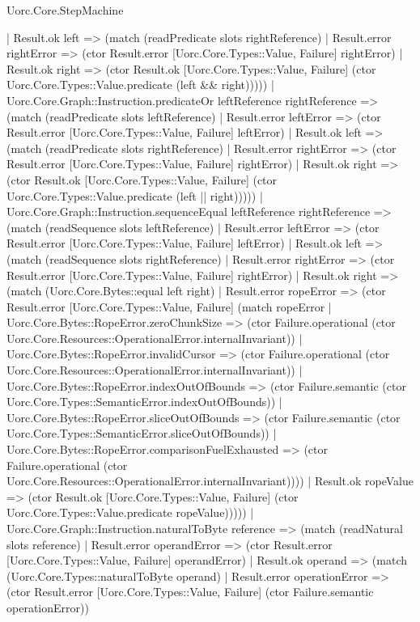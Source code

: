 \begin{lexlean}{Uorc.Core.StepMachine}
\begin{semanticmodule}
{      | Result.ok left => (match (readPredicate slots rightReference)
        | Result.error rightError => (ctor Result.error [Uorc.Core.Types::Value, Failure] rightError)
        | Result.ok right => (ctor Result.ok [Uorc.Core.Types::Value, Failure] (ctor Uorc.Core.Types::Value.predicate (left && right)))))
    | Uorc.Core.Graph::Instruction.predicateOr leftReference rightReference => (match (readPredicate slots leftReference)
      | Result.error leftError => (ctor Result.error [Uorc.Core.Types::Value, Failure] leftError)
      | Result.ok left => (match (readPredicate slots rightReference)
        | Result.error rightError => (ctor Result.error [Uorc.Core.Types::Value, Failure] rightError)
        | Result.ok right => (ctor Result.ok [Uorc.Core.Types::Value, Failure] (ctor Uorc.Core.Types::Value.predicate (left || right)))))
    | Uorc.Core.Graph::Instruction.sequenceEqual leftReference rightReference => (match (readSequence slots leftReference)
      | Result.error leftError => (ctor Result.error [Uorc.Core.Types::Value, Failure] leftError)
      | Result.ok left => (match (readSequence slots rightReference)
        | Result.error rightError => (ctor Result.error [Uorc.Core.Types::Value, Failure] rightError)
        | Result.ok right => (match (Uorc.Core.Bytes::equal left right)
          | Result.error ropeError => (ctor Result.error [Uorc.Core.Types::Value, Failure] (match ropeError
            | Uorc.Core.Bytes::RopeError.zeroChunkSize => (ctor Failure.operational (ctor Uorc.Core.Resources::OperationalError.internalInvariant))
            | Uorc.Core.Bytes::RopeError.invalidCursor => (ctor Failure.operational (ctor Uorc.Core.Resources::OperationalError.internalInvariant))
            | Uorc.Core.Bytes::RopeError.indexOutOfBounds => (ctor Failure.semantic (ctor Uorc.Core.Types::SemanticError.indexOutOfBounds))
            | Uorc.Core.Bytes::RopeError.sliceOutOfBounds => (ctor Failure.semantic (ctor Uorc.Core.Types::SemanticError.sliceOutOfBounds))
            | Uorc.Core.Bytes::RopeError.comparisonFuelExhausted => (ctor Failure.operational (ctor Uorc.Core.Resources::OperationalError.internalInvariant))))
          | Result.ok ropeValue => (ctor Result.ok [Uorc.Core.Types::Value, Failure] (ctor Uorc.Core.Types::Value.predicate ropeValue)))))
    | Uorc.Core.Graph::Instruction.naturalToByte reference => (match (readNatural slots reference)
      | Result.error operandError => (ctor Result.error [Uorc.Core.Types::Value, Failure] operandError)
      | Result.ok operand => (match (Uorc.Core.Types::naturalToByte operand)
        | Result.error operationError => (ctor Result.error [Uorc.Core.Types::Value, Failure] (ctor Failure.semantic operationError))
}
\end{semanticmodule}
\end{lexlean}
